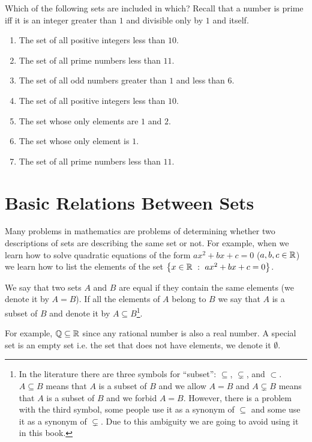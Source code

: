 \begin{exercise}
  \label{exercise:inclusion}

  Which of the following sets are included in which? Recall that a number is
  prime iff it is an integer greater than $1$ and divisible only by $1$ and
  itself.
  \begin{enumerate}
    \item The set of all positive integers less than $10$.
    \item The set of all prime numbers less than $11$.
    \item The set of all odd numbers greater than $1$ and less than $6$.
    \item The set of all positive integers less than $10$.
    \item The set whose only elements are $1$ and $2$.
    \item The set whose only element is $1$.
    \item The set of all prime numbers less than $11$.
  \end{enumerate}
\end{exercise}

\section{Basic Relations Between Sets}
Many problems in mathematics are problems of determining whether two descriptions
of sets are describing the same set or not. For example, when we learn how to
solve quadratic equations of the form $ax^2 + bx + c = 0$ ($a, b, c \in {\mathbb{R}}$) we
learn how to list the elements of the set $\set[ax^2 + bx + c = 0]{x \in \R}$.

We say that two sets $A$ and $B$ are equal if they contain the
same elements (we denote it by $A = B$). If all the elements of $A$ belong to
$B$ we say that $A$ is a subset of $B$ and denote it by
$A \subseteq B$\footnote{%
  In the literature there are three symbols for ``subset'': $\subseteq$,
  $\subsetneq$, and $\subset$. $A \subseteq B$ means that $A$ is a subset of
  $B$ and we allow $A = B$ and $A \subsetneq B$ means that $A$ is a subset of
  $B$ and we forbid $A = B$. However, there is a problem with the third symbol,
  some people use it as a synonym of $\subseteq$ and some use it as a synonym of
  $\subsetneq$. Due to this ambiguity we are going to avoid using it in this
  book.
}.

For example, ${\mathbb{Q}} \subseteq {\mathbb{R}}$ since any rational number is
also a real number. A special set is an empty set i.e. the set that does not
have elements, we denote it $\emptyset$.

